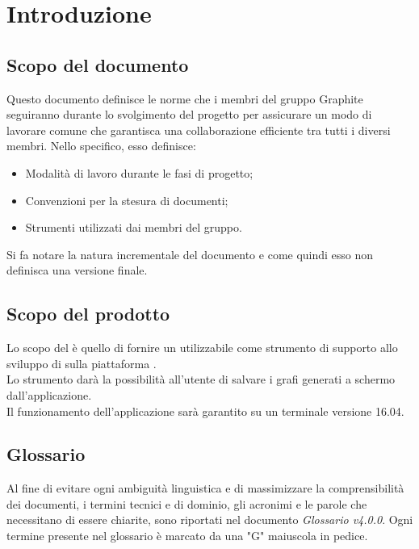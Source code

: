\documentclass[./NormediProgetto.tex]{subfiles}
\begin{document}
	
\chapter{Introduzione}

\section{Scopo del documento}

Questo documento definisce le norme che i membri del gruppo Graphite seguiranno durante lo svolgimento del progetto per assicurare un modo di lavorare comune che garantisca una collaborazione efficiente tra tutti i diversi
membri. Nello specifico, esso definisce:

\begin{itemize}
	\item Modalità di lavoro durante le fasi di progetto;
	\item Convenzioni per la stesura di documenti;
	\item Strumenti utilizzati dai membri del gruppo.
\end{itemize}
Si fa notare la natura incrementale del documento e come quindi esso non definisca una versione finale.
\section{Scopo del prodotto}

Lo scopo del  è quello di fornire un  utilizzabile come strumento di supporto allo sviluppo di  sulla piattaforma . 
\\ \noindent Lo strumento darà la possibilità all'utente di salvare i grafi generati a schermo dall'applicazione.
\\ \noindent Il funzionamento dell'applicazione sarà garantito su un terminale  versione 16.04.

\section{Glossario}

Al fine di evitare ogni ambiguità linguistica e di massimizzare la comprensibilità dei documenti, i termini tecnici e di dominio, gli acronimi e le parole che necessitano di essere chiarite, sono riportati nel documento \textit{Glossario v4.0.0}.
Ogni termine presente nel glossario è marcato da una "G" maiuscola in pedice.
\end{document}
